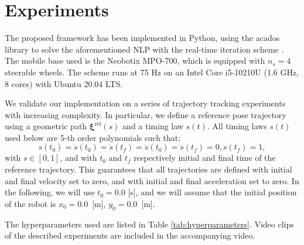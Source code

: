 
\section{Experiments}
\label{sec:simulations-and-experiments}
The proposed framework has been implemented in Python, using the acados library \cite{Verschueren2021acados} to solve the aforementioned NLP with the real-time iteration scheme \cite{Gros2020Fromlineartononlinear}. The mobile base used is the Neobotix MPO-700, which is equipped with $n_s=4$ steerable wheels. The scheme runs at 75 Hz on an Intel Core i5-10210U (1.6 GHz, 8 cores) with Ubuntu 20.04 LTS.

We validate our implementation on a series of trajectory tracking experiments with increasing complexity. In particular, we define a reference pose trajectory using a geometric path $\bm{\xi}^{\mathrm{ref}}(s)$ and a timing law $s(t)$. All timing laws $s(t)$ used below are 5-th order polynomials such that:
\begin{equation*}
s(t_0) = \dot{s}(t_0) = \dot{s}(t_f) = \ddot{s}(t_0) = \ddot{s}(t_f)=0, s(t_f)=1,
\end{equation*}
with $s \in [0, 1]$, and with $t_0$ and $t_f$ respectively initial and final time of the reference trajectory. This guarantees that all trajectories are defined with initial and final velocity set to zero, and with initial and final acceleration set to zero. In the following, we will use $t_0 = 0.0$ [s], and we will assume that the initial position of the robot is $x_0 = 0.0$~[m], $y_0 = 0.0$~[m].

The hyperparameters used are listed in Table \ref{tab:hyperparameters}. Video clips of the described experiments are included in the accompanying video. %

